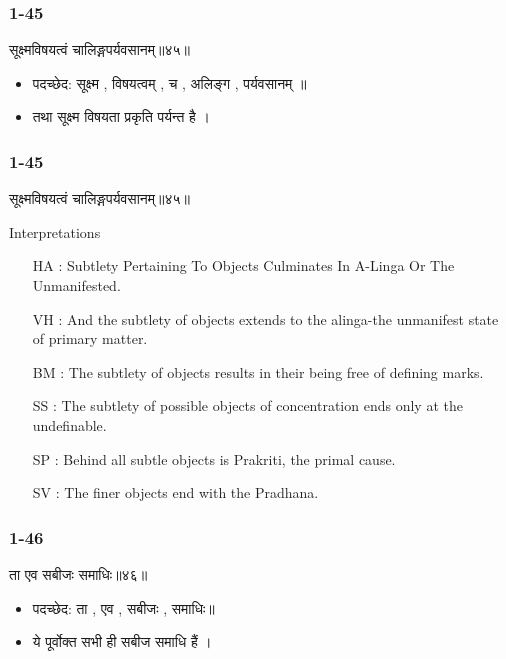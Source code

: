 \begin{frame}[fragile]\frametitle{1-45}
\begin{sanskrit}
सूक्ष्मविषयत्वं चालिङ्गपर्यवसानम्॥४५॥
\end{sanskrit}

\begin{itemize}
\item पदच्छेद: सूक्ष्म , विषयत्वम् , च , अलिङ्ग , पर्यवसानम् ॥
\item तथा सूक्ष्म विषयता प्रकृति पर्यन्त है ।
\end{itemize}

\end{frame}


\begin{frame}[fragile]\frametitle{1-45}
\begin{sanskrit}
सूक्ष्मविषयत्वं चालिङ्गपर्यवसानम्॥४५॥
\end{sanskrit}

Interpretations
\begin{itemize}
\item [HA]: Subtlety Pertaining To Objects Culminates In A-Linga Or The Unmanifested.
\item [VH]: And the subtlety of objects extends to the alinga-the unmanifest state of primary matter.
\item [BM]: The subtlety of objects results in their being free of defining marks.
\item [SS]: The subtlety of possible objects of concentration ends only at the undefinable.
\item [SP]: Behind all subtle objects is Prakriti, the primal cause.
\item [SV]: The finer objects end with the Pradhana. 
\end{itemize}
	
\end{frame}

\begin{frame}[fragile]\frametitle{1-46}
\begin{sanskrit}
ता एव सबीजः समाधिः॥४६॥
\end{sanskrit}

\begin{itemize}
\item पदच्छेद: ता , एव , सबीजः , समाधिः॥
\item ये पूर्वोक्त सभी ही सबीज समाधि हैं ।
\end{itemize}
	
\end{frame}

